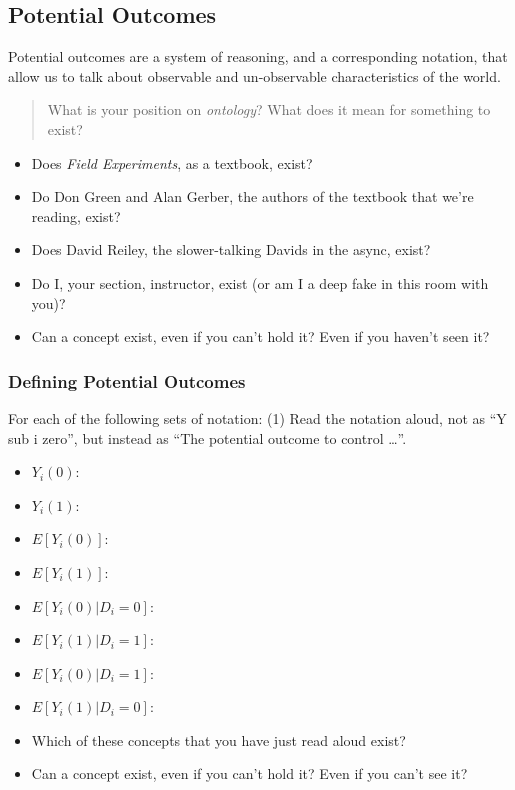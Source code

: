 \documentclass[
]{article}
\providecommand{\tightlist}{%
  \setlength{\itemsep}{0pt}\setlength{\parskip}{0pt}}
\theoremstyle{definition}
\theoremstyle{definition}
\theoremstyle{definition}
\theoremstyle{definition}
\theoremstyle{remark}
\begin{document}
\subsection{Potential Outcomes}\label{potential-outcomes}

Potential outcomes are a system of reasoning, and a corresponding notation, that allow us to talk about observable and un-observable characteristics of the world.

\begin{quote}
What is your position on \emph{ontology}? What does it mean for something to exist?
\end{quote}

\begin{itemize}
\tightlist
\item
  Does \emph{Field Experiments}, as a textbook, exist?
\item
  Do Don Green and Alan Gerber, the authors of the textbook that we're reading, exist?
\item
  Does David Reiley, the slower-talking Davids in the async, exist?
\item
  Do I, your section, instructor, exist (or am I a deep fake in this room with you)?
\item
  Can a concept exist, even if you can't hold it? Even if you haven't seen it?
\end{itemize}

\subsubsection{Defining Potential Outcomes}\label{defining-potential-outcomes}

For each of the following sets of notation: (1) Read the notation aloud, not as ``Y sub i zero'', but instead as ``The potential outcome to control \ldots{}''.

\begin{itemize}
\item
  \(Y_{i}(0)\):
\item
  \(Y_{i}(1)\):\\
\item
  \(E[Y_{i}(0)]\):
\item
  \(E[Y_{i}(1)]\):
\item
  \(E[Y_{i}(0)|D_{i}=0]\):
\item
  \(E[Y_{i}(1)|D_{i}=1]\):
\item
  \(E[Y_{i}(0)|D_{i}=1]\):
\item
  \(E[Y_{i}(1)|D_{i}=0]\):
\item
  Which of these concepts that you have just read aloud exist?
\item
  Can a concept exist, even if you can't hold it? Even if you can't see it?
\end{itemize}
\end{document}
